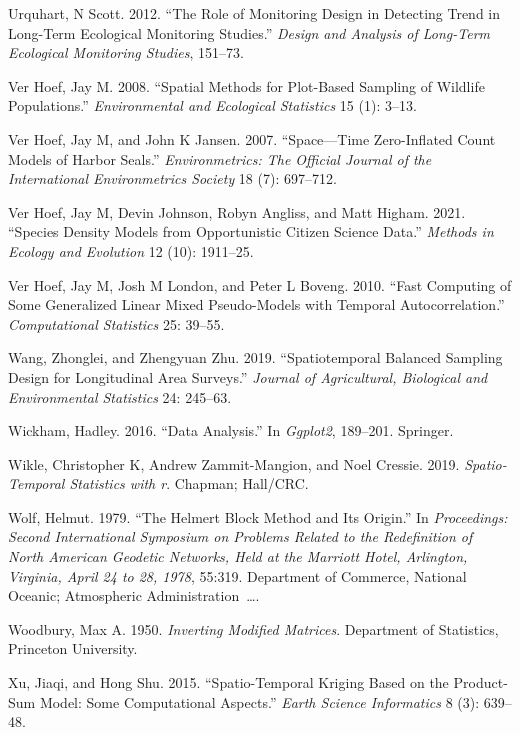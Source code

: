 \documentclass[]{article}    %
\newlength{\cslhangindent}
\newlength{\cslentryspacingunit} %
\newenvironment{CSLReferences}[2] %
 {%
  \setlength{\parindent}{0pt}
  \ifodd #1
  \let\oldpar\par
  \def\par{\hangindent=\cslhangindent\oldpar}
  \fi
  \setlength{\parskip}{#2\cslentryspacingunit}
 }%
 {}
\begin{document}
\begin{CSLReferences}{1}{0}
\leavevmode{}%
Urquhart, N Scott. 2012. {``The Role of Monitoring Design in Detecting
Trend in Long-Term Ecological Monitoring Studies.''} \emph{Design and
Analysis of Long-Term Ecological Monitoring Studies}, 151--73.

\leavevmode{}%
Ver Hoef, Jay M. 2008. {``Spatial Methods for Plot-Based Sampling of
Wildlife Populations.''} \emph{Environmental and Ecological Statistics}
15 (1): 3--13.

\leavevmode{}%
Ver Hoef, Jay M, and John K Jansen. 2007. {``Space---Time Zero-Inflated
Count Models of Harbor Seals.''} \emph{Environmetrics: The Official
Journal of the International Environmetrics Society} 18 (7): 697--712.

\leavevmode{}%
Ver Hoef, Jay M, Devin Johnson, Robyn Angliss, and Matt Higham. 2021.
{``Species Density Models from Opportunistic Citizen Science Data.''}
\emph{Methods in Ecology and Evolution} 12 (10): 1911--25.

\leavevmode{}%
Ver Hoef, Jay M, Josh M London, and Peter L Boveng. 2010. {``Fast
Computing of Some Generalized Linear Mixed Pseudo-Models with Temporal
Autocorrelation.''} \emph{Computational Statistics} 25: 39--55.

\leavevmode{}%
Wang, Zhonglei, and Zhengyuan Zhu. 2019. {``Spatiotemporal Balanced
Sampling Design for Longitudinal Area Surveys.''} \emph{Journal of
Agricultural, Biological and Environmental Statistics} 24: 245--63.

\leavevmode{}%
Wickham, Hadley. 2016. {``Data Analysis.''} In \emph{Ggplot2}, 189--201.
Springer.

\leavevmode{}%
Wikle, Christopher K, Andrew Zammit-Mangion, and Noel Cressie. 2019.
\emph{Spatio-Temporal Statistics with r}. Chapman; Hall/CRC.

\leavevmode{}%
Wolf, Helmut. 1979. {``The Helmert Block Method and Its Origin.''} In
\emph{Proceedings: Second International Symposium on Problems Related to
the Redefinition of North American Geodetic Networks, Held at the
Marriott Hotel, Arlington, Virginia, April 24 to 28, 1978}, 55:319.
Department of Commerce, National Oceanic; Atmospheric
Administration~\ldots.

\leavevmode{}%
Woodbury, Max A. 1950. \emph{Inverting Modified Matrices}. Department of
Statistics, Princeton University.

\leavevmode{}%
Xu, Jiaqi, and Hong Shu. 2015. {``Spatio-Temporal Kriging Based on the
Product-Sum Model: Some Computational Aspects.''} \emph{Earth Science
Informatics} 8 (3): 639--48.

\end{CSLReferences}


% 
% 
\end{document}
